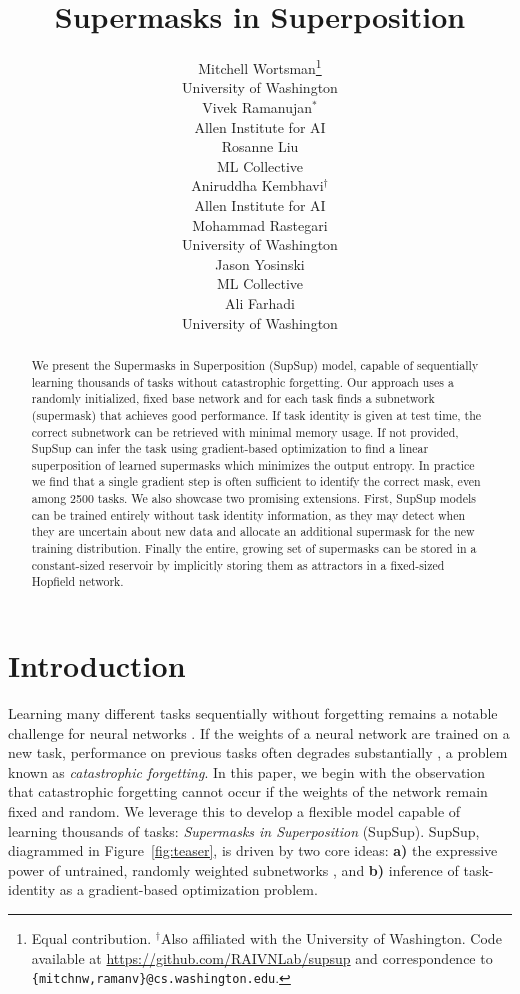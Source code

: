 \documentclass{article}
\title{Supermasks in Superposition}
\author{%
  Mitchell Wortsman\thanks{Equal contribution. $^\dagger$Also affiliated with the University of Washington. Code available at \url{https://github.com/RAIVNLab/supsup} and correspondence to \texttt{\{mitchnw,ramanv\}@cs.washington.edu}.} \\
    University of Washington \\
    \And
      Vivek Ramanujan$^*$ \\
    Allen Institute for AI \\
        \And
      Rosanne Liu \\
    ML Collective \\
        \And
      Aniruddha Kembhavi$^\dagger$ \\
    Allen Institute for AI \\
        \And
      Mohammad Rastegari \\
    University of Washington \\
            \And
      Jason Yosinski \\
    ML Collective \\
        \And
      Ali Farhadi \\
    University of Washington \\
}
\newcommand{\ac}{SupSup\xspace}
\newcommand{\figref}[1]{Figure~\ref{fig:#1}}
\begin{document}


\maketitle




\begin{abstract}
We present the Supermasks in Superposition (SupSup) model, capable of sequentially learning thousands of tasks without catastrophic forgetting. Our approach uses a randomly initialized, fixed base network and for each task finds a subnetwork (supermask) that achieves good performance. If task identity is given at test time, the correct subnetwork can be retrieved with minimal memory usage. If not provided, SupSup can infer the task using gradient-based optimization to find a linear superposition of learned supermasks which minimizes the output entropy. In practice we find that a single gradient step is often sufficient to identify the correct mask, even among 2500 tasks. We also showcase two promising extensions. First, SupSup models can be trained entirely without task identity information, as they may detect when they are uncertain about new data and allocate an additional supermask for the new training distribution. Finally the entire, growing set of supermasks can be stored in a constant-sized reservoir by implicitly storing them as attractors in a fixed-sized Hopfield network.
\end{abstract}



\section{Introduction}

Learning many different tasks sequentially without forgetting remains a notable challenge for neural networks \cite{thrun1998lifelong, zhao1996incremental, kirkpatrick2017overcoming}. If the weights of a neural network are trained on a new task, performance on previous tasks often degrades substantially \cite{mccloskey1989catastrophic,french1999catastrophic, goodfellow2013empirical}, a problem known as \emph{catastrophic forgetting}.
In this paper, we begin with the observation that catastrophic forgetting cannot occur if the weights of the network remain fixed and random. We leverage this to develop a flexible model capable of learning thousands of tasks: \textit{Supermasks in Superposition} (\ac). \ac, diagrammed in \figref{teaser}, is driven by two core ideas: \textbf{a)} the expressive power of untrained, randomly weighted subnetworks \cite{zhou2019deconstructing, ramanujan2019s}, and \textbf{b)} inference of task-identity as a gradient-based optimization problem.
\end{document}
